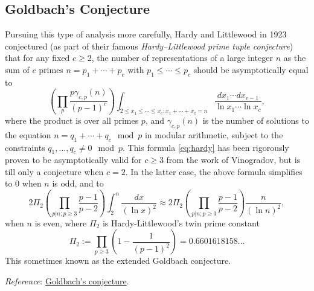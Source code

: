 \subsection{Goldbach's Conjecture}
Pursuing this type of analysis more carefully, Hardy and Littlewood in 1923 conjectured (as part of their famous \textsl{Hardy–Littlewood prime tuple conjecture}) that for any fixed $c \geq 2$, the number of representations of a large integer $n$ as the sum of $c$ primes $n = p_1 + \cdots + p_{c}$ with $p_1 \leq \cdots \leq p_c$ should be asymptotically equal to
\begin{equation}
    \label{eq:hardy}
    \left( \prod_{p} \frac{p \gamma_{c,p} (n)}{(p - 1)^c}\right) \int_{2 \leq x_1 \leq \cdots \leq x_c: x_1 + \cdots + x_c = n} \frac{d x_1 \cdots d x_{c - 1}}{\ln{x_1} \cdots \ln{x_c}},
\end{equation}
where the product is over all primes $p$, and $\gamma_{c, p}(n)$ is the number of solutions to the equation $n = q_1 + \cdots + q_c \mod p$ in modular arithmetic, subject to the constraints $q_1, \ldots, q_c \ne 0 \mod p$. This formula \eqref{eq:hardy} has been rigorously proven to be asymptotically valid for $c \geq 3$ from the work of Vinogradov, but is till only a conjecture when $c = 2$. In the latter case, the above formula simplifies to $0$ when $n$ is odd, and to
$$
2 \Pi_2 \left( \prod_{p|n; p \geq 3} \frac{p - 1}{p - 2} \right) \int_{2}^{n} \frac{dx}{(\ln{x})^2} \approx 2 \Pi_2 \left( \prod_{p|n; p \geq 3} \frac{p - 1}{p - 2} \right) \frac{n}{(\ln{n})^2},
$$
when $n$ is even, where $\Pi_2$ is Hardy-Littlewood's twin prime constant
$$
\Pi_2 := \prod_{p \geq 3} \left( 1 - \frac{1}{(p - 1)^2} \right) = 0.6601618158\ldots
$$
This sometimes known as the \textsf{extended Goldbach conjecture}.

\emph{Reference}: \href{https://en.wikipedia.org/wiki/Goldbach's_conjecture}{Goldbach's conjecture}.
